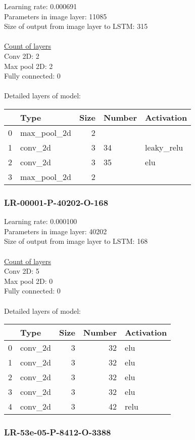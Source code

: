 Learning rate: 0.000691
\\Parameters in image layer: 11085
\\Size of output from image layer to LSTM: 315
\\\\\underline{Count of layers} 
\\Conv 2D:           2\\Max pool 2D:      2\\Fully connected:  0
\\\\Detailed layers of model: \\\begin{tabular}{rlrll}
\hline
    & Type        &   Size & Number   & Activation   \\
\hline
  0 & max\_pool\_2d &      2 &          &              \\
  1 & conv\_2d     &      3 & 34       & leaky\_relu   \\
  2 & conv\_2d     &      3 & 35       & elu          \\
  3 & max\_pool\_2d &      2 &          &              \\
\hline
\end{tabular}\subsubsection*{LR-00001-P-40202-O-168}
Learning rate: 0.000100
\\Parameters in image layer: 40202
\\Size of output from image layer to LSTM: 168
\\\\\underline{Count of layers} 
\\Conv 2D:           5\\Max pool 2D:      0\\Fully connected:  0
\\\\Detailed layers of model: \\\begin{tabular}{rlrrl}
\hline
    & Type    &   Size &   Number & Activation   \\
\hline
  0 & conv\_2d &      3 &       32 & elu          \\
  1 & conv\_2d &      3 &       32 & elu          \\
  2 & conv\_2d &      3 &       32 & elu          \\
  3 & conv\_2d &      3 &       32 & elu          \\
  4 & conv\_2d &      3 &       42 & relu         \\
\hline
\end{tabular}\subsubsection*{LR-53e-05-P-8412-O-3388}

